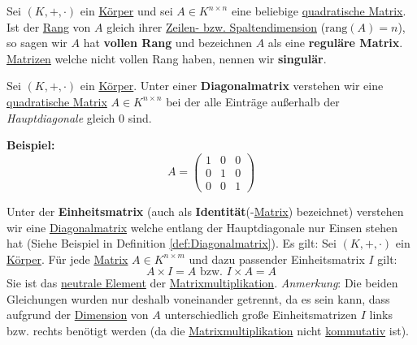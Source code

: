 \documentclass[../../main.tex]{subfiles}
\begin{document}
	\begin{definition}
		\label{def:reguläreMatrix}
		\label{def:singuläreMatrix}
		\label{def:vollerRang}
		Sei $(K,+,\cdot)$ ein \hyperref[def:Körper]{Körper} und sei $A\in K^{n \times n}$ eine beliebige \hyperref[def:QuadratischeMatrix]{quadratische Matrix}. Ist der \hyperref[def:RangMatrix]{Rang} von $A$ gleich ihrer \hyperref[def:DimensionMatrix]{Zeilen- bzw. Spaltendimension} ($\textrm{rang}(A)=n$), so sagen wir $A$ hat \textbf{vollen Rang} und bezeichnen $A$ als eine \textbf{reguläre Matrix}. \hyperref[def:Matrix]{Matrizen} welche nicht vollen Rang haben, nennen wir \textbf{singulär}. 
	\end{definition}

	\begin{definition}[Diagonalmatrix]
		\label{def:Diagonalmatrix}
		Sei $(K,+,\cdot)$ ein \hyperref[def:Körper]{Körper}. Unter einer \textbf{Diagonalmatrix} verstehen wir eine \hyperref[def:QuadratischeMatrix]{quadratische Matrix} $A\in K^{n \times n}$ bei der alle Einträge außerhalb der \textit{Hauptdiagonale} gleich 0 sind. 
		
		\textbf{Beispiel:}
		$$
		A = \begin{pmatrix}
		1 & 0 & 0 \\
		0 & 1 & 0 \\
		0 & 0 & 1
		\end{pmatrix}
		$$
	\end{definition}

	\begin{definition}
		\label{def:Einheitsmatrix}
		\label{def:Identitätsmatrix}
		Unter der \textbf{Einheitsmatrix} (auch als \textbf{Identität}(-\hyperref[def:Matrix]{Matrix}) bezeichnet) verstehen wir eine \hyperref[def:Diagonalmatrix]{Diagonalmatrix} welche entlang der Hauptdiagonale nur Einsen stehen hat (Siehe Beispiel in Definition \ref{def:Diagonalmatrix}). Es gilt: Sei $(K,+,\cdot)$ ein \hyperref[def:Körper]{Körper}. Für jede \hyperref[def:Matrix]{Matrix} $A \in K^{n \times m}$ und dazu passender Einheitsmatrix $I$ gilt: $$A \times I = A \textrm{ bzw. } I \times A = A$$
		Sie ist das \hyperref[def:neutralesElement]{neutrale Element} der \hyperref[def:Matrixmultiplikation]{Matrixmultiplikation}. \textit{Anmerkung}: Die beiden Gleichungen wurden nur deshalb voneinander getrennt, da es sein kann, dass aufgrund der \hyperref[def:Dimension]{Dimension} von $A$ unterschiedlich große Einheitsmatrizen $I$ links bzw. rechts benötigt werden (da die \hyperref[def:Matrixmultiplikation]{Matrixmultiplikation} nicht \hyperref[def:kommutativ]{kommutativ} ist).
	\end{definition}
\end{document}
